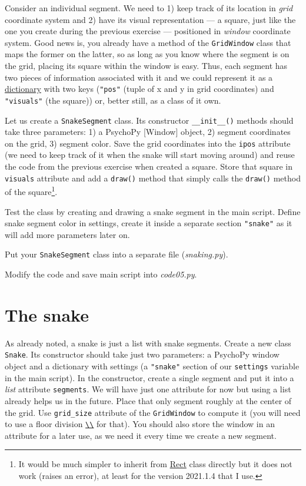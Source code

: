 \documentclass[
]{book}
\begin{document}
Consider an individual segment. We need to 1) keep track of its location in \emph{grid} coordinate system and 2) have its visual representation --- a square, just like the one you create during the previous exercise --- positioned in \emph{window} coordinate system. Good news is, you already have a method of the \texttt{GridWindow} class that maps the former on the latter, so as long as you know where the segment is on the grid, placing its square within the window is easy. Thus, each segment has two pieces of information associated with it and we could represent it as a \href{https://docs.python.org/3/tutorial/datastructures.html\#dictionaries}{dictionary} with two keys (\texttt{"pos"} (tuple of x and y in grid coordinates) and \texttt{"visuals"} (the square)) or, better still, as a class of it own.

Let us create a \texttt{SnakeSegment} class. Its constructor \texttt{\_\_init\_\_()} methods should take three parameters: 1) a PsychoPy {[}Window{]} object, 2) segment coordinates on the grid, 3) segment color. Save the grid coordinates into the \texttt{ipos} attribute (we need to keep track of it when the snake will start moving around) and reuse the code from the previous exercise when created a square. Store that square in \texttt{visuals} attribute and add a \texttt{draw()} method that simply calls the \texttt{draw()} method of the square\footnote{It would be much simpler to inherit from \href{https://psychopy.org/api/visual/rect.html\#psychopy.visual.rect.Rect}{Rect} class directly but it does not work (raises an error), at least for the version 2021.1.4 that I use.}.

Test the class by creating and drawing a snake segment in the main script. Define snake segment color in settings, create it inside a separate section \texttt{"snake"} as it will add more parameters later on.

Put your \texttt{SnakeSegment} class into a separate file (\emph{snaking.py}).

Modify the code and save main script into \emph{code05.py}.

\hypertarget{the-snake-1}{%
\section{The snake}\label{the-snake-1}}

As already noted, a snake is just a list with snake segments. Create a new class \texttt{Snake}. Its constructor should take just two parameters: a PsychoPy window object and a dictionary with settings (a \texttt{"snake"} section of our \texttt{settings} variable in the main script). In the constructor, create a single segment and put it into a \emph{list} attribute \texttt{segments}. We will have just one attribute for now but using a list already helps us in the future. Place that only segment roughly at the center of the grid. Use \texttt{grid\_size} attribute of the \texttt{GridWindow} to compute it (you will need to use a floor division \href{https://docs.python.org/3/library/operator.html\#mapping-operators-to-functions}{\texttt{\textbackslash{}\textbackslash{}}} for that). You should also store the window in an attribute for a later use, as we need it every time we create a new segment.
\end{document}
